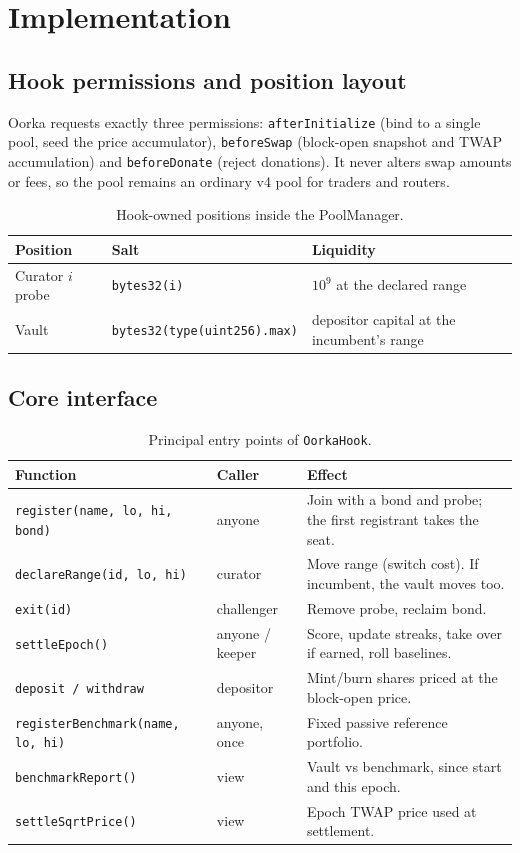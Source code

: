 \documentclass[11pt,a4paper]{article}
\newcommand{\code}[1]{\texttt{\small #1}}
\begin{document}
\section{Implementation}
\subsection{Hook permissions and position layout}
Oorka requests exactly three permissions: \code{afterInitialize} (bind to a single pool, seed the price accumulator), \code{beforeSwap} (block-open snapshot and TWAP accumulation) and \code{beforeDonate} (reject donations). It never alters swap amounts or fees, so the pool remains an ordinary v4 pool for traders and routers.

\begin{table}[H]
\centering\small
\begin{tabular}{@{}lll@{}}
\toprule
\textbf{Position} & \textbf{Salt} & \textbf{Liquidity} \\
\midrule
Curator $i$ probe & \code{bytes32(i)} & $10^9$ at the declared range \\
Vault & \code{bytes32(type(uint256).max)} & depositor capital at the incumbent's range \\
\bottomrule
\end{tabular}
\caption{Hook-owned positions inside the PoolManager.}
\end{table}

\subsection{Core interface}
\begin{table}[H]
\centering\small
\begin{tabularx}{\linewidth}{@{}l l X@{}}
\toprule
\textbf{Function} & \textbf{Caller} & \textbf{Effect} \\
\midrule
\code{register(name, lo, hi, bond)} & anyone & Join with a bond and probe; the first registrant takes the seat. \\
\code{declareRange(id, lo, hi)} & curator & Move range (switch cost). If incumbent, the vault moves too. \\
\code{exit(id)} & challenger & Remove probe, reclaim bond. \\
\code{settleEpoch()} & anyone / keeper & Score, update streaks, take over if earned, roll baselines. \\
\code{deposit / withdraw} & depositor & Mint/burn shares priced at the block-open price. \\
\code{registerBenchmark(name, lo, hi)} & anyone, once & Fixed passive reference portfolio. \\
\code{benchmarkReport()} & view & Vault vs benchmark, since start and this epoch. \\
\code{settleSqrtPrice()} & view & Epoch TWAP price used at settlement. \\
\bottomrule
\end{tabularx}
\caption{Principal entry points of \code{OorkaHook}.}
\end{table}
\end{document}
